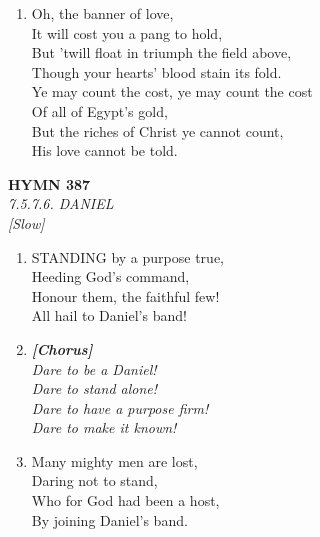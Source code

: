 \documentclass[11pt,a4paper]{article}
\begin{document}
\begin{enumerate}
    \item Oh, the banner of love, \\
        It will cost you a pang to hold, \\
        But 'twill float in triumph the field above, \\
        Though your hearts' blood stain its fold. \\
        Ye may count the cost, ye may count the cost \\
        Of all of Egypt's gold, \\
        But the riches of Christ ye cannot count, \\
        His love cannot be told.

\end{enumerate}

\newpage
\begin{center}
    {\Large \textbf{HYMN 387}}
    \\
    \textit{7.5.7.6. DANIEL}
    \\
    \textit{\small [Slow]}
\end{center}
\vspace{1em}

\begin{enumerate}
    \item STANDING by a purpose true, \\
        Heeding God's command, \\
        Honour them, the faithful few! \\
        All hail to Daniel's band!

    \item[] \vspace{0.4em}
    \textbf{\textit{[Chorus]}} \\
    \textit{Dare to be a Daniel!} \\
    \textit{Dare to stand alone!} \\
    \textit{Dare to have a purpose firm!} \\
    \textit{Dare to make it known!}
    \vspace{0.4em}

    \item Many mighty men are lost, \\
        Daring not to stand, \\
        Who for God had been a host, \\
        By joining Daniel's band.

\end{enumerate}
\end{document}
